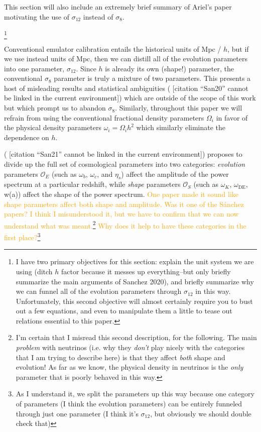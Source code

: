 \documentclass[11pt]{article}
\newcommand{\cbib}[1]
{\IfFileExists{biblatex.sty}
{\cite{#1}}
{[citation ``#1'' cannot be linked in the current environment]}}
\begin{document}
This section will also include an extremely brief summary of Ariel's paper motivating the use of $\sigma_{12}$ instead of $\sigma_8$.

\footnote{
    I have two primary objectives for this section: explain the unit system
    we are using (ditch $h$ factor because it messes up everything--but
    only briefly summarize the main arguments of Sanchez 2020), and briefly
    summarize why we can funnel all of the evolution parameters through
    $\sigma_{12}$ in this way. Unfortunately, this second objective will
    almost certainly require you to bust out a few equations, and even to
    manipulate them a little to tease out relations essential to this paper.
}

Conventional emulator calibration entails the historical units of Mpc / $h$,
but if we use instead units of Mpc, then we can distill all of the evolution
parameters into one parameter, $\sigma_{12}$. Since $h$ is already its own
(shape!) parameter, the conventional $\sigma_8$ parameter is truly a mixture
of two parameters. This presents a host of misleading results  and statistical
ambiguities (\cbib{San20}) which are outside of the scope of this work but
which prompt us to abandon $\sigma_8$.
Similarly, throughout this paper we will refrain from using the conventional
fractional density parameters $\Omega_i$ in favor of the physical density
parameters $\omega_i = \Omega_i h^2$ which similarly eliminate the
dependence on $h$.

(\cbib{San21}) proposes to divide up the full set of cosmological
parameters into two categories: \textit{evolution} parameters $\mathcal{O}_E$
(such as $\omega_b$, $\omega_c$, and $\eta_s$)
affect the amplitude of the power spectrum at a particular redshift, while
\textit{shape} parameters $\mathcal{O}_S$
(such as $\omega_K$, $\omega_\text{DE}$, w(a))
affect the shape of the power
spectrum. \textcolor{orange}{One paper made it sound like shape parameters
affect both shape and amplitude. Was it one of the S\'{a}nchez papers? I think
I misunderstood it, but we have to confirm that we can now understand what was
meant.\footnote{
    I'm certain that I misread this second description, for the following.
    The main \textit{problem} with neutrinos (i.e. why they \textit{don't}
    play nicely with the categories that I am trying to describe here)
    is that they affect \textit{both} shape and evolution! As far as we know,
    the physical density in neutrinos is the \textit{only} parameter that
    is poorly behaved in this way.
}
Why does it help to have these categories in the first place?}\footnote{
    As I understand it, we split the parameters up this way because
    one category of parameters (I think the evolution parameters)
    can be entirely funneled through just one parameter
    (I think it's $\sigma_{12}$, but obviously we should double check that)
}
\end{document}

